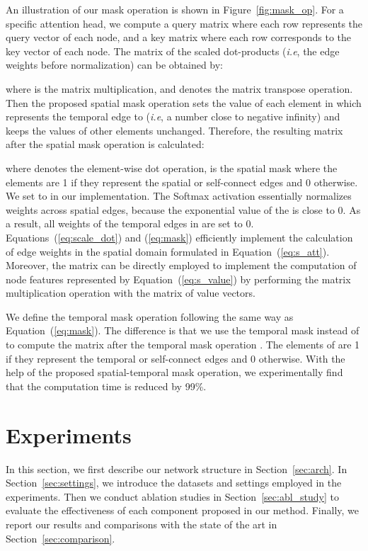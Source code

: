 \documentclass{bmvc2k}
\def\ie{\emph{i.e}\bmvaOneDot}
\begin{document}
An illustration of our mask operation is shown in Figure~\ref{fig:mask_op}. For a specific attention head, we compute a query matrix  where each row represents the query vector of each node, and a key matrix  where each row corresponds to the key vector of each node. The matrix of the scaled dot-products  (\ie, the edge weights before normalization) can be obtained by:

where  is the matrix multiplication, and  denotes the matrix transpose operation. Then the proposed spatial mask operation sets the value of each element in  which represents the temporal edge to  (\ie, a number close to negative infinity) and keeps the values of other elements unchanged. Therefore, the resulting matrix after the spatial mask operation   is calculated:

where  denotes the element-wise dot operation,  is the spatial mask where the elements are 1 if they represent the spatial or self-connect edges and 0 otherwise. We set  to  in our implementation. The Softmax activation  essentially normalizes weights across spatial edges, because the exponential value of the  is close to 0. As a result, all weights of the temporal edges in  are set to 0. Equations~(\ref{eq:scale_dot}) and (\ref{eq:mask}) efficiently implement the calculation of edge weights in the spatial domain formulated in Equation~(\ref{eq:s_att}). Moreover, the matrix  can be directly employed to implement the computation of node features represented by Equation~(\ref{eq:s_value}) by performing the matrix multiplication operation with the matrix of value vectors. 

We define the temporal mask operation following the same way as Equation~(\ref{eq:mask}). The difference is that we use the temporal mask  instead of  to compute the matrix after the temporal mask operation  . The elements of  are 1 if they represent the temporal or self-connect edges and 0 otherwise. With the help of the proposed spatial-temporal mask operation, we experimentally find that the computation time is reduced by 99\%.
%
 \section{Experiments}
In this section, we first describe our network structure in Section~\ref{sec:arch}. In Section~\ref{sec:settings}, we introduce the datasets and settings employed in the experiments. Then we conduct ablation studies in Section~\ref{sec:abl_study} to evaluate the effectiveness of each component proposed in our method. Finally, we report our results and comparisons with the state of the art in Section~\ref{sec:comparison}.
\end{document}
